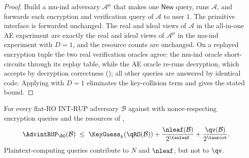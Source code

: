 \begin{proof}
Build a mu-ind adversary $\mathcal{A}^{\mu}$ that makes one
$\mathsf{New}$ query, runs $\mathcal{A}$, and forwards each
encryption and verification query of $\mathcal{A}$ to user $1$. The
primitive interface is forwarded unchanged. The real and ideal views of
$\mathcal{A}$ in the all-in-one AE experiment are exactly the real and
ideal views of $\mathcal{A}^{\mu}$ in the mu-ind experiment with
$D = 1$, and the resource counts are unchanged. On a replayed
encryption tuple the two real verification oracles agree: the mu-ind
oracle short-circuits through its replay table, while the AE oracle
re-runs decryption, which accepts by \TW{} decryption correctness
(); all other queries are answered by identical
code. Applying
 with $D = 1$ eliminates the key-collision term and
gives the stated bound.
\end{proof}

\begin{theorem}
\label{thm:int-rup-ro}
For every flat-RO \textsf{INT-RUP} adversary $\mathcal{B}$ against \TW{}
with nonce-respecting encryption queries and the resources of
,
\[
  \AdvintRUP_{\RO}(\mathcal{B})
  \;\leq\;
  \KeyGuess_k(\qRO(\mathcal{B}))
  + \frac{\nleaf(\mathcal{B})}{2^{\tauleaf}}
  + \frac{\qv(\mathcal{B})}{2^{\tauroot}}.
\]
Plaintext-computing queries contribute to $N$ and $\nleaf$, but not to
$\qv$.
\end{theorem}

